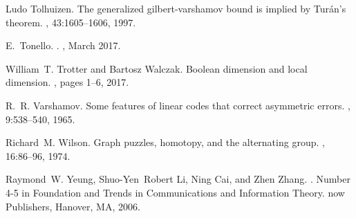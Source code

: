 \documentclass[a4paper, 11pt]{book}
\numberwithin{equation}{section}
\theoremstyle{plain}
\renewcommand{\(}{\ldbrack}
\renewcommand{\)}{\rdbrack}
\begin{document}
\begin{thebibliography}{100}
Ludo Tolhuizen.
\newblock The generalized gilbert-varshamov bound is implied by {T}ur\'an's
  theorem.
, 43:1605--1606, 1997.

E.~{Tonello}.
.
, March 2017.

William~T. Trotter and Bartosz Walczak.
\newblock Boolean dimension and local dimension.
, pages 1--6, 2017.

R.~R. Varshamov.
\newblock Some features of linear codes that correct asymmetric errors.
, 9:538--540, 1965.

Richard~M. Wilson.
\newblock Graph puzzles, homotopy, and the alternating group.
, 16:86--96, 1974.

Raymond~W. Yeung, Shuo-Yen~Robert Li, Ning Cai, and Zhen Zhang.
.
\newblock Number 4-5 in Foundation and Trends in Communications and Information
  Theory. now Publishers, Hanover, MA, 2006.


\end{thebibliography}
\end{document}
